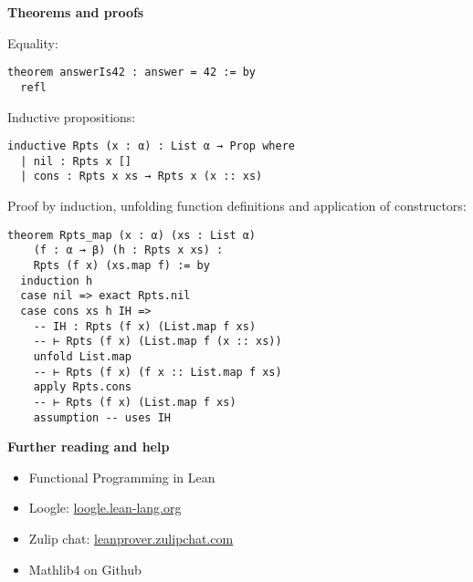 \documentclass[11pt,DIV=16,parskip=half,headings=normal,abstract]{scrartcl}
\begin{document}
\begin{multicols*}{2}
\columnbreak
\textbf{Theorems and proofs}

Equality:
\begin{lstlisting}
theorem answerIs42 : answer = 42 := by
  refl
\end{lstlisting}

\goodbreak

Inductive propositions:
\begin{lstlisting}
inductive Rpts (x : α) : List α → Prop where
  | nil : Rpts x []
  | cons : Rpts x xs → Rpts x (x :: xs)
\end{lstlisting}

Proof by induction, unfolding function definitions and application of constructors:
\begin{lstlisting}
theorem Rpts_map (x : α) (xs : List α)
    (f : α → β) (h : Rpts x xs) :
    Rpts (f x) (xs.map f) := by
  induction h
  case nil => exact Rpts.nil
  case cons xs h IH =>
    -- IH : Rpts (f x) (List.map f xs)
    -- ⊢ Rpts (f x) (List.map f (x :: xs))
    unfold List.map
    -- ⊢ Rpts (f x) (f x :: List.map f xs)
    apply Rpts.cons
    -- ⊢ Rpts (f x) (List.map f xs)
    assumption -- uses IH
\end{lstlisting}


\textbf{Further reading and help}
\begin{itemize}
\item Functional Programming in Lean %
\item Loogle: \href{https://loogle.lean-lang.org/}{loogle.lean-lang.org}
\item Zulip chat: \href{https://leanprover.zulipchat.com/}{leanprover.zulipchat.com}
\item Mathlib4 on Github %
\end{itemize}



\end{multicols*}
\end{document}
